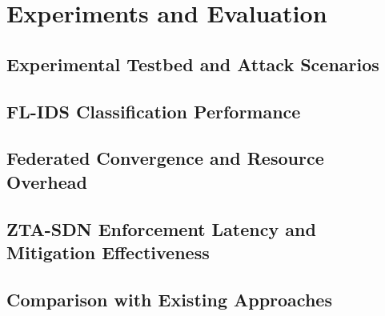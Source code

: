 \chapter{Experiments and Evaluation}
\label{ch:experiments_evaluation}


\section{Experimental Testbed and Attack Scenarios}
\label{sec:testbed_scenarios}

\section{FL-IDS Classification Performance}
\label{sec:eval_fl_metrics}

\section{Federated Convergence and Resource Overhead}
\label{sec:eval_convergence}

\section{ZTA-SDN Enforcement Latency and Mitigation Effectiveness}
\label{sec:eval_sdn_latency}

\section{Comparison with Existing Approaches}
\label{sec:eval_comparison}

